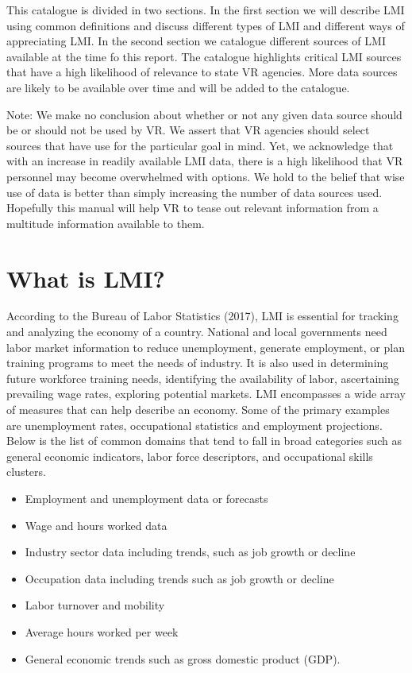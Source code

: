 \documentclass[]{book}
\providecommand{\tightlist}{%
  \setlength{\itemsep}{0pt}\setlength{\parskip}{0pt}}
\theoremstyle{definition}
\theoremstyle{definition}
\theoremstyle{definition}
\theoremstyle{remark}
\begin{document}
This catalogue is divided in two sections. In the first section we will
describe LMI using common definitions and discuss different types of LMI
and different ways of appreciating LMI. In the second section we
catalogue different sources of LMI available at the time fo this report.
The catalogue highlights critical LMI sources that have a high
likelihood of relevance to state VR agencies. More data sources are
likely to be available over time and will be added to the catalogue.

Note: We make no conclusion about whether or not any given data source
should be or should not be used by VR. We assert that VR agencies should
select sources that have use for the particular goal in mind. Yet, we
acknowledge that with an increase in readily available LMI data, there
is a high likelihood that VR personnel may become overwhelmed with
options. We hold to the belief that wise use of data is better than
simply increasing the number of data sources used.\\
Hopefully this manual will help VR to tease out relevant information
from a multitude information available to them.

\chapter{What is LMI?}\label{what-is-lmi}

According to the Bureau of Labor Statistics (2017), LMI is essential for
tracking and analyzing the economy of a country. National and local
governments need labor market information to reduce unemployment,
generate employment, or plan training programs to meet the needs of
industry. It is also used in determining future workforce training
needs, identifying the availability of labor, ascertaining prevailing
wage rates, exploring potential markets. LMI encompasses a wide array of
measures that can help describe an economy. Some of the primary examples
are unemployment rates, occupational statistics and employment
projections. Below is the list of common domains that tend to fall in
broad categories such as general economic indicators, labor force
descriptors, and occupational skills clusters.

\begin{itemize}
\tightlist
\item
  Employment and unemployment data or forecasts
\item
  Wage and hours worked data
\item
  Industry sector data including trends, such as job growth or decline
\item
  Occupation data including trends such as job growth or decline
\item
  Labor turnover and mobility
\item
  Average hours worked per week
\item
  General economic trends such as gross domestic product (GDP).
\end{itemize}
\end{document}
